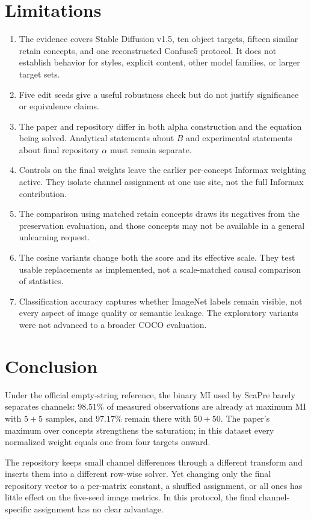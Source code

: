 \documentclass[11pt]{article}
\begin{document}
\section{Limitations}
\begin{enumerate}[label=\arabic*.]
    \item The evidence covers Stable Diffusion v1.5, ten object targets, fifteen similar retain concepts, and one reconstructed Confuse5 protocol. It does not establish behavior for styles, explicit content, other model families, or larger target sets.
    \item Five edit seeds give a useful robustness check but do not justify significance or equivalence claims.
    \item The paper and repository differ in both alpha construction and the equation being solved. Analytical statements about $B$ and experimental statements about final repository $\alpha$ must remain separate.
    \item Controls on the final weights leave the earlier per-concept Informax weighting active. They isolate channel assignment at one use site, not the full Informax contribution.
    \item The comparison using matched retain concepts draws its negatives from the preservation evaluation, and those concepts may not be available in a general unlearning request.
    \item The cosine variants change both the score and its effective scale. They test usable replacements as implemented, not a scale-matched causal comparison of statistics.
    \item Classification accuracy captures whether ImageNet labels remain visible, not every aspect of image quality or semantic leakage. The exploratory variants were not advanced to a broader COCO evaluation.
\end{enumerate}

\section{Conclusion}
Under the official empty-string reference, the binary MI used by ScaPre barely separates channels: $98.51\%$ of measured observations are already at maximum MI with $5+5$ samples, and $97.17\%$ remain there with $50+50$. The paper's maximum over concepts strengthens the saturation; in this dataset every normalized weight equals one from four targets onward.

The repository keeps small channel differences through a different transform and inserts them into a different row-wise solver. Yet changing only the final repository vector to a per-matrix constant, a shuffled assignment, or all ones has little effect on the five-seed image metrics. In this protocol, the final channel-specific assignment has no clear advantage.
\end{document}
